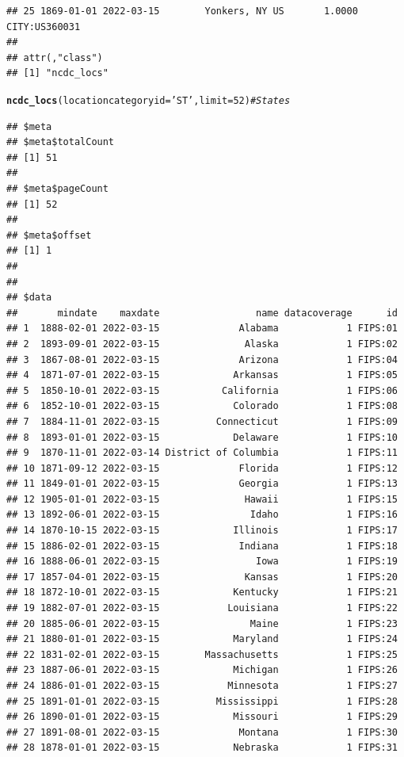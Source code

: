 \documentclass{article}\usepackage[]{graphicx}\usepackage[]{color}
\makeatletter
\newcommand{\hlnum}[1]{\textcolor[rgb]{0.686,0.059,0.569}{#1}}%
\newcommand{\hlstr}[1]{\textcolor[rgb]{0.192,0.494,0.8}{#1}}%
\newcommand{\hlcom}[1]{\textcolor[rgb]{0.678,0.584,0.686}{\textit{#1}}}%
\newcommand{\hlstd}[1]{\textcolor[rgb]{0.345,0.345,0.345}{#1}}%
\newcommand{\hlkwc}[1]{\textcolor[rgb]{0.333,0.667,0.333}{#1}}%
\newcommand{\hlkwd}[1]{\textcolor[rgb]{0.737,0.353,0.396}{\textbf{#1}}}%
\newenvironment{kframe}{%
 \def\at@end@of@kframe{}%
 \ifinner\ifhmode%
  \def\at@end@of@kframe{\end{minipage}}%
  \begin{minipage}{\columnwidth}%
 \fi\fi%
 \def\FrameCommand##1{\hskip\@totalleftmargin \hskip-\fboxsep
 \colorbox{shadecolor}{##1}\hskip-\fboxsep
     \hskip-\linewidth \hskip-\@totalleftmargin \hskip\columnwidth}%
 \MakeFramed {\advance\hsize-\width
   \@totalleftmargin\z@ \linewidth\hsize
   \@setminipage}}%
 {\par\unskip\endMakeFramed%
 \at@end@of@kframe}
\newenvironment{knitrout}{}{} %
\makeatother
\begin{document}
\begin{knitrout}
\begin{kframe}
\begin{verbatim}
## 25 1869-01-01 2022-03-15        Yonkers, NY US       1.0000 CITY:US360031
## 
## attr(,"class")
## [1] "ncdc_locs"
\end{verbatim}
\begin{alltt}
\hlkwd{ncdc_locs}\hlstd{(}\hlkwc{locationcategoryid}\hlstd{=}\hlstr{'ST'}\hlstd{,} \hlkwc{limit}\hlstd{=}\hlnum{52}\hlstd{)} \hlcom{# States}
\end{alltt}
\begin{verbatim}
## $meta
## $meta$totalCount
## [1] 51
## 
## $meta$pageCount
## [1] 52
## 
## $meta$offset
## [1] 1
## 
## 
## $data
##       mindate    maxdate                 name datacoverage      id
## 1  1888-02-01 2022-03-15              Alabama            1 FIPS:01
## 2  1893-09-01 2022-03-15               Alaska            1 FIPS:02
## 3  1867-08-01 2022-03-15              Arizona            1 FIPS:04
## 4  1871-07-01 2022-03-15             Arkansas            1 FIPS:05
## 5  1850-10-01 2022-03-15           California            1 FIPS:06
## 6  1852-10-01 2022-03-15             Colorado            1 FIPS:08
## 7  1884-11-01 2022-03-15          Connecticut            1 FIPS:09
## 8  1893-01-01 2022-03-15             Delaware            1 FIPS:10
## 9  1870-11-01 2022-03-14 District of Columbia            1 FIPS:11
## 10 1871-09-12 2022-03-15              Florida            1 FIPS:12
## 11 1849-01-01 2022-03-15              Georgia            1 FIPS:13
## 12 1905-01-01 2022-03-15               Hawaii            1 FIPS:15
## 13 1892-06-01 2022-03-15                Idaho            1 FIPS:16
## 14 1870-10-15 2022-03-15             Illinois            1 FIPS:17
## 15 1886-02-01 2022-03-15              Indiana            1 FIPS:18
## 16 1888-06-01 2022-03-15                 Iowa            1 FIPS:19
## 17 1857-04-01 2022-03-15               Kansas            1 FIPS:20
## 18 1872-10-01 2022-03-15             Kentucky            1 FIPS:21
## 19 1882-07-01 2022-03-15            Louisiana            1 FIPS:22
## 20 1885-06-01 2022-03-15                Maine            1 FIPS:23
## 21 1880-01-01 2022-03-15             Maryland            1 FIPS:24
## 22 1831-02-01 2022-03-15        Massachusetts            1 FIPS:25
## 23 1887-06-01 2022-03-15             Michigan            1 FIPS:26
## 24 1886-01-01 2022-03-15            Minnesota            1 FIPS:27
## 25 1891-01-01 2022-03-15          Mississippi            1 FIPS:28
## 26 1890-01-01 2022-03-15             Missouri            1 FIPS:29
## 27 1891-08-01 2022-03-15              Montana            1 FIPS:30
## 28 1878-01-01 2022-03-15             Nebraska            1 FIPS:31

\end{verbatim}
\end{kframe}
\end{knitrout}
\end{document}
